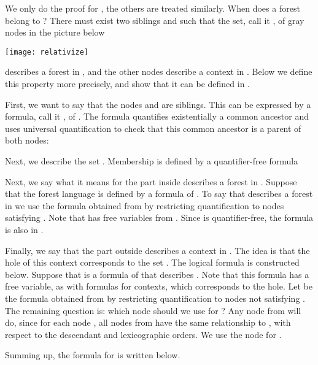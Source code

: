 \documentclass{LMCS}
\begin{document}
\proof
  We only do the proof for , the others are treated similarly. 
When does a forest  belong to ? There must exist two siblings  and  such that the set, call it , of gray nodes in the picture below
\medskip
\begin{center}
\texttt{[image: relativize]}
\end{center}
describes a forest in , and the other nodes describe a context in . Below
we define this property more precisely, and show that it can be defined in
\Stwol.

First, we want to say that the nodes  and  are siblings. This can be
expressed by a formula, call it , of \Stwol. The formula
quantifies existentially a common ancestor and uses universal quantification to
check that this common ancestor is a parent of both nodes:


Next, we describe the set .  Membership  is defined by a quantifier-free formula 


Next, we say what it means for the part inside  describes a forest in . Suppose that the forest language  is defined by a formula  of \Stwol. To say that  describes a forest in  we use the formula    obtained from  by restricting quantification to nodes satisfying .  Note that    has free variables  from . Since  is quantifier-free, the formula  is also in \Stwol.

Finally, we  say that the part outside   describes a context in . The idea is that the hole of this context corresponds to the set . The logical formula is constructed below. Suppose that  is a formula of \Stwol that describes . Note that this formula has a free variable, as with formulas for contexts, which corresponds to the hole. Let  be the formula obtained from  by restricting quantification to nodes not satisfying . The remaining question is: which node should we use for ? Any node from  will do, since for each node ,  all nodes from  have the same relationship to , with respect to the descendant and lexicographic orders. We use the node  for .

Summing up, the formula for  is written below.
\end{document}
